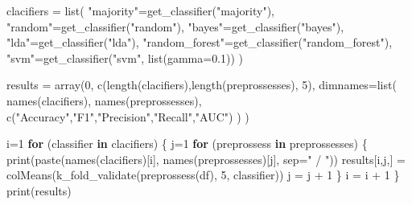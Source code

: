 \documentclass[
]{article}
\newenvironment{Shaded}{\begin{snugshade}}{\end{snugshade}}
\newcommand{\AttributeTok}[1]{\textcolor[rgb]{0.77,0.63,0.00}{#1}}
\newcommand{\ControlFlowTok}[1]{\textcolor[rgb]{0.13,0.29,0.53}{\textbf{#1}}}
\newcommand{\DecValTok}[1]{\textcolor[rgb]{0.00,0.00,0.81}{#1}}
\newcommand{\FloatTok}[1]{\textcolor[rgb]{0.00,0.00,0.81}{#1}}
\newcommand{\FunctionTok}[1]{\textcolor[rgb]{0.00,0.00,0.00}{#1}}
\newcommand{\NormalTok}[1]{#1}
\newcommand{\OtherTok}[1]{\textcolor[rgb]{0.56,0.35,0.01}{#1}}
\newcommand{\SpecialCharTok}[1]{\textcolor[rgb]{0.00,0.00,0.00}{#1}}
\newcommand{\StringTok}[1]{\textcolor[rgb]{0.31,0.60,0.02}{#1}}
\begin{document}
\begin{Shaded}
\begin{Highlighting}[]
\NormalTok{clacifiers }\OtherTok{=} \FunctionTok{list}\NormalTok{(}
    \StringTok{"majority"}\OtherTok{=}\FunctionTok{get\_classifier}\NormalTok{(}\StringTok{"majority"}\NormalTok{),}
    \StringTok{"random"}\OtherTok{=}\FunctionTok{get\_classifier}\NormalTok{(}\StringTok{"random"}\NormalTok{),}
    \StringTok{"bayes"}\OtherTok{=}\FunctionTok{get\_classifier}\NormalTok{(}\StringTok{"bayes"}\NormalTok{),}
    \StringTok{"lda"}\OtherTok{=}\FunctionTok{get\_classifier}\NormalTok{(}\StringTok{"lda"}\NormalTok{),}
    \StringTok{"random\_forest"}\OtherTok{=}\FunctionTok{get\_classifier}\NormalTok{(}\StringTok{"random\_forest"}\NormalTok{),}
    \StringTok{"svm"}\OtherTok{=}\FunctionTok{get\_classifier}\NormalTok{(}\StringTok{"svm"}\NormalTok{, }\FunctionTok{list}\NormalTok{(}\AttributeTok{gamma=}\FloatTok{0.1}\NormalTok{))}
\NormalTok{)}

\NormalTok{results }\OtherTok{=} \FunctionTok{array}\NormalTok{(}\DecValTok{0}\NormalTok{, }
    \FunctionTok{c}\NormalTok{(}\FunctionTok{length}\NormalTok{(clacifiers),}\FunctionTok{length}\NormalTok{(preprossesses), }\DecValTok{5}\NormalTok{),}
    \AttributeTok{dimnames=}\FunctionTok{list}\NormalTok{(}
        \FunctionTok{names}\NormalTok{(clacifiers),}
        \FunctionTok{names}\NormalTok{(preprossesses),}
        \FunctionTok{c}\NormalTok{(}\StringTok{"Accuracy"}\NormalTok{,}\StringTok{"F1"}\NormalTok{,}\StringTok{"Precision"}\NormalTok{,}\StringTok{"Recall"}\NormalTok{,}\StringTok{"AUC"}\NormalTok{)}
\NormalTok{    )}
\NormalTok{)}

\NormalTok{i}\OtherTok{=}\DecValTok{1}
\ControlFlowTok{for}\NormalTok{ (classifier }\ControlFlowTok{in}\NormalTok{ clacifiers) \{}
\NormalTok{    j}\OtherTok{=}\DecValTok{1}
    \ControlFlowTok{for}\NormalTok{ (preprossess }\ControlFlowTok{in}\NormalTok{ preprossesses) \{}
        \FunctionTok{print}\NormalTok{(}\FunctionTok{paste}\NormalTok{(}\FunctionTok{names}\NormalTok{(clacifiers)[i], }\FunctionTok{names}\NormalTok{(preprossesses)[j], }\AttributeTok{sep=}\StringTok{" / "}\NormalTok{))}
\NormalTok{        results[i,j,] }\OtherTok{=} \FunctionTok{colMeans}\NormalTok{(}\FunctionTok{k\_fold\_validate}\NormalTok{(}\FunctionTok{preprossess}\NormalTok{(df), }\DecValTok{5}\NormalTok{, classifier))}
\NormalTok{        j }\OtherTok{=}\NormalTok{ j }\SpecialCharTok{+} \DecValTok{1}
\NormalTok{    \}}
\NormalTok{    i }\OtherTok{=}\NormalTok{ i }\SpecialCharTok{+} \DecValTok{1}
\NormalTok{\}}
\FunctionTok{print}\NormalTok{(results)}
\end{Highlighting}
\end{Shaded}
\end{document}
